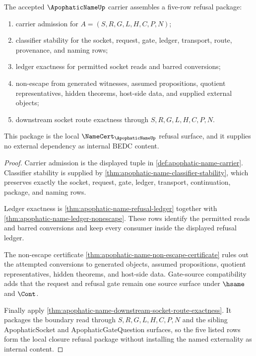 \begin{theorem}
\label{thm:apophatic-name-closure-refusal-package}
The accepted $\ApophaticNameUp$ carrier assembles a five-row refusal package:
\begin{enumerate}
\item carrier admission for $A=(S,R,G,L,H,C,P,N)$;
\item classifier stability for the socket, request, gate, ledger, transport, route, provenance, and naming rows;
\item ledger exactness for permitted socket reads and barred conversions;
\item non-escape from generated witnesses, assumed propositions, quotient representatives, hidden theorems, host-side data, and supplied external objects;
\item downstream socket route exactness through $S,R,G,L,H,C,P,N$.
\end{enumerate}
This package is the local $\NameCert_{\ApophaticNameUp}$ refusal surface, and it supplies no external dependency as internal BEDC content.
\end{theorem}
\begin{proof}
Carrier admission is the displayed tuple in \autoref{def:apophatic-name-carrier}. Classifier stability is supplied by \autoref{thm:apophatic-name-classifier-stability}, which preserves exactly the socket, request, gate, ledger, transport, continuation, package, and naming rows.

Ledger exactness is \autoref{thm:apophatic-name-refusal-ledger} together with \autoref{thm:apophatic-name-ledger-nonescape}. These rows identify the permitted reads and barred conversions and keep every consumer inside the displayed refusal ledger.

The non-escape certificate \autoref{thm:apophatic-name-non-escape-certificate} rules out the attempted conversions to generated objects, assumed propositions, quotient representatives, hidden theorems, and host-side data. Gate-source compatibility adds that the request and refusal gate remain one source surface under $\hsame$ and $\Cont$.

Finally apply \autoref{thm:apophatic-name-downstream-socket-route-exactness}. It packages the boundary read through $S,R,G,L,H,C,P,N$ and the sibling ApophaticSocket and ApophaticGateQuestion surfaces, so the five listed rows form the local closure refusal package without installing the named externality as internal content.
\end{proof}

